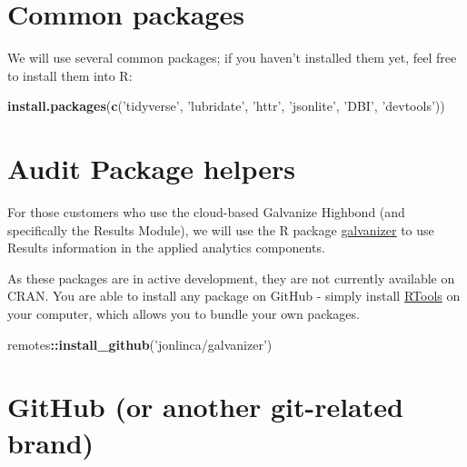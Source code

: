 \documentclass[
]{book}
\newenvironment{Shaded}{\begin{snugshade}}{\end{snugshade}}
\newcommand{\KeywordTok}[1]{\textcolor[rgb]{0.13,0.29,0.53}{\textbf{#1}}}
\newcommand{\NormalTok}[1]{#1}
\newcommand{\OperatorTok}[1]{\textcolor[rgb]{0.81,0.36,0.00}{\textbf{#1}}}
\newcommand{\StringTok}[1]{\textcolor[rgb]{0.31,0.60,0.02}{#1}}
\begin{document}
\hypertarget{common-packages}{%
\section{Common packages}\label{common-packages}}

We will use several common packages; if you haven't installed them yet, feel free to install them into R:

\begin{Shaded}
\begin{Highlighting}[]
\KeywordTok{install.packages}\NormalTok{(}\KeywordTok{c}\NormalTok{(}\StringTok{'tidyverse'}\NormalTok{, }\StringTok{'lubridate'}\NormalTok{, }\StringTok{'httr'}\NormalTok{, }\StringTok{'jsonlite'}\NormalTok{, }\StringTok{'DBI'}\NormalTok{, }\StringTok{'devtools'}\NormalTok{))}
\end{Highlighting}
\end{Shaded}

\hypertarget{audit-package-helpers}{%
\section{Audit Package helpers}\label{audit-package-helpers}}

For those customers who use the cloud-based Galvanize Highbond (and specifically the Results Module), we will use the R package \href{https://github.com/jonlinca/galvanizer}{galvanizer} to use Results information in the applied analytics components.

As these packages are in active development, they are not currently available on CRAN. You are able to install any package on GitHub - simply install \href{https://cran.r-project.org/bin/windows/Rtools/}{RTools} on your computer, which allows you to bundle your own packages.

\begin{Shaded}
\begin{Highlighting}[]
\NormalTok{remotes}\OperatorTok{::}\KeywordTok{install_github}\NormalTok{(}\StringTok{'jonlinca/galvanizer'}\NormalTok{)}
\end{Highlighting}
\end{Shaded}

\hypertarget{github-or-another-git-related-brand}{%
\section{GitHub (or another git-related brand)}\label{github-or-another-git-related-brand}}
\end{document}
